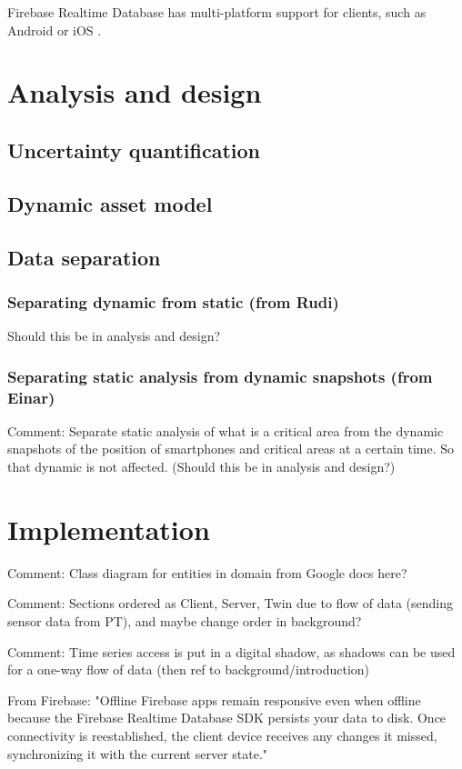 \documentclass{article}
\begin{document}
Firebase Realtime Database has multi-platform support for clients, such as Android or iOS \cite{noauthor_firebase_nodate}.



\newpage
\section{Analysis and design}\label{sec:Analysis}
\subsection{Uncertainty quantification}
\subsection{Dynamic asset model}
\subsection{Data separation}
\subsubsection{Separating dynamic from static (from Rudi)}
Should this be in analysis and design?
\subsubsection{Separating static analysis from dynamic snapshots (from Einar)}
Comment: Separate static analysis of what is a critical area from the dynamic snapshots of the position of smartphones and critical areas at a certain time. So that dynamic is not affected. (Should this be in analysis and design?)



\newpage
\section{Implementation}\label{sec:Implementation}

Comment: Class diagram for entities in domain from Google docs here?

Comment: Sections ordered as Client, Server, Twin due to flow of data (sending sensor data from PT), and maybe change order in background?

Comment: Time series access is put in a digital shadow, as shadows can be used for a one-way flow of data (then ref to background/introduction)

From Firebase: "Offline	Firebase apps remain responsive even when offline because the Firebase Realtime Database SDK persists your data to disk. Once connectivity is reestablished, the client device receives any changes it missed, synchronizing it with the current server state." 
\end{document}
